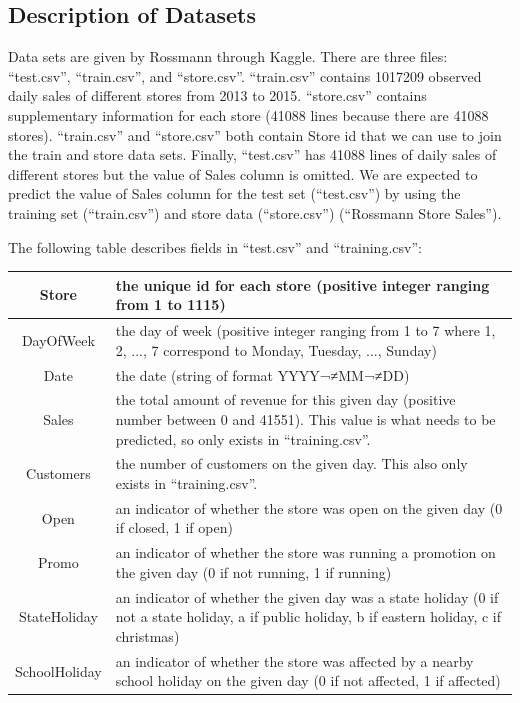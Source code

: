 \documentclass[letterpaper,twocolumn,11pt]{article}
\begin{document}
\subsection{Description of Datasets}
Data sets are given by Rossmann through Kaggle. There are three files: ``test.csv'', ``train.csv'', and ``store.csv''. ``train.csv'' contains 1017209 observed daily sales of different stores from 2013 to 2015. ``store.csv'' contains supplementary information for each store (41088 lines because there are 41088 stores). ``train.csv'' and ``store.csv'' both contain Store id that we can use to join the train and store data sets. Finally, ``test.csv'' has 41088 lines of daily sales of different stores but the value of Sales column is omitted. We are expected to predict the value of Sales column for the test set (``test.csv'') by using the training set (``train.csv'') and store data (``store.csv'') (``Rossmann Store Sales'').

\newpage
The following table describes fields in ``test.csv'' and ``training.csv'':

\begin{tabular}{| c | L{4cm} |}
  \hline
  Store & the unique id for each store (positive integer ranging from 1 to 1115) \\ \hline
  DayOfWeek & the day of week (positive integer ranging from 1 to 7 where 1, 2, ..., 7 correspond to Monday, Tuesday, ..., Sunday) \\ \hline
  Date & the date (string of format YYYY¬≠MM¬≠DD) \\ \hline
  Sales & the total amount of revenue for this given day (positive number between 0 and 41551). This value is what needs to be predicted, so only exists in ``training.csv''. \\ \hline
  Customers & the number of customers on the given day. This also only exists in ``training.csv''. \\ \hline
  Open & an indicator of whether the store was open on the given day (0 if closed, 1 if open) \\ \hline
  Promo & an indicator of whether the store was running a promotion on the given day (0 if not running, 1 if running) \\ \hline
  StateHoliday & an indicator of whether the given day was a state holiday (0 if not a state holiday, a if public holiday, b if eastern holiday, c if christmas) \\ \hline
  SchoolHoliday & an indicator of whether the store was affected by a nearby school holiday on the given day (0 if not affected, 1 if affected) \\ \hline
\end{tabular}
\end{document}
